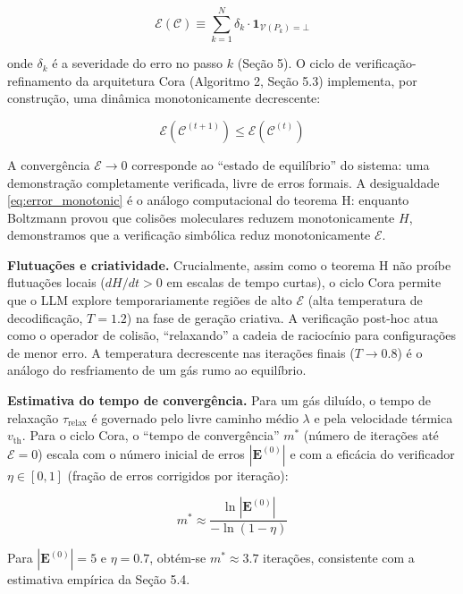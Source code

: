 \documentclass[5p]{elsarticle}
\theoremstyle{remark}
\begin{document}
\begin{equation}
\mathcal{E}(\mathcal{C}) \equiv \sum_{k=1}^{N} \delta_k \cdot \mathbf{1}_{\mathcal{V}(P_k) = \bot}
\label{eq:error_functional}
\end{equation}

onde $\delta_k$ é a severidade do erro no passo $k$ (Seção 5). O ciclo de verificação-refinamento da arquitetura Cora (Algoritmo 2, Seção 5.3) implementa, por construção, uma dinâmica monotonicamente decrescente:

\begin{equation}
\mathcal{E}(\mathcal{C}^{(t+1)}) \leq \mathcal{E}(\mathcal{C}^{(t)})
\label{eq:error_monotonic}
\end{equation}

A convergência $\mathcal{E} \to 0$ corresponde ao ``estado de equilíbrio'' do sistema: uma demonstração completamente verificada, livre de erros formais. A desigualdade \ref{eq:error_monotonic} é o análogo computacional do teorema H: enquanto Boltzmann provou que colisões moleculares reduzem monotonicamente $H$, demonstramos que a verificação simbólica reduz monotonicamente $\mathcal{E}$.

\textbf{Flutuações e criatividade.} Crucialmente, assim como o teorema H não proíbe flutuações locais ($dH/dt > 0$ em escalas de tempo curtas), o ciclo Cora permite que o LLM explore temporariamente regiões de alto $\mathcal{E}$ (alta temperatura de decodificação, $T = 1.2$) na fase de geração criativa. A verificação post-hoc atua como o operador de colisão, ``relaxando'' a cadeia de raciocínio para configurações de menor erro. A temperatura decrescente nas iterações finais ($T \to 0.8$) é o análogo do resfriamento de um gás rumo ao equilíbrio.

\textbf{Estimativa do tempo de convergência.} Para um gás diluído, o tempo de relaxação $\tau_{\text{relax}}$ é governado pelo livre caminho médio $\lambda$ e pela velocidade térmica $v_{\text{th}}$. Para o ciclo Cora, o ``tempo de convergência'' $m^*$ (número de iterações até $\mathcal{E} = 0$) escala com o número inicial de erros $|\mathbf{E}^{(0)}|$ e com a eficácia do verificador $\eta \in [0, 1]$ (fração de erros corrigidos por iteração):

\begin{equation}
m^* \approx \frac{\ln |\mathbf{E}^{(0)}|}{-\ln(1 - \eta)}
\label{eq:convergence_time}
\end{equation}

Para $|\mathbf{E}^{(0)}| = 5$ e $\eta = 0.7$, obtém-se $m^* \approx 3.7$ iterações, consistente com a estimativa empírica da Seção 5.4.
\end{document}
